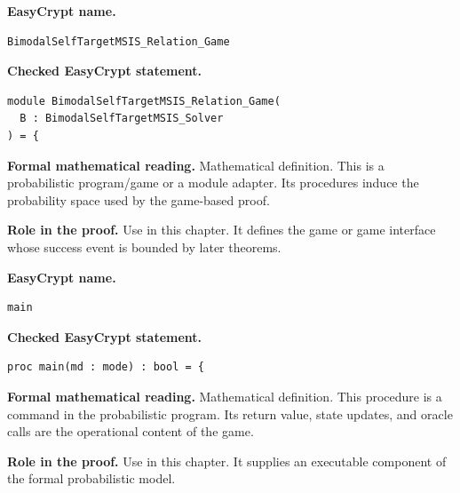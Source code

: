 \begin{formaldefinition}
\noindent\textbf{EasyCrypt name.}
\begin{lstlisting}[language=EasyCrypt,basicstyle=\ttfamily\scriptsize]
BimodalSelfTargetMSIS_Relation_Game
\end{lstlisting}
\noindent\textbf{Checked EasyCrypt statement.}
\begin{lstlisting}[language=EasyCrypt,basicstyle=\ttfamily\scriptsize]
module BimodalSelfTargetMSIS_Relation_Game(
  B : BimodalSelfTargetMSIS_Solver
) = {
\end{lstlisting}
\noindent\textbf{Formal mathematical reading.}
Mathematical definition. This is a probabilistic program/game or a module adapter.  Its procedures induce the probability space used by the game-based proof.

\noindent\textbf{Role in the proof.}
Use in this chapter. It defines the game or game interface whose success event is bounded by later theorems.

\end{formaldefinition}

\begin{formaldefinition}
\noindent\textbf{EasyCrypt name.}
\begin{lstlisting}[language=EasyCrypt,basicstyle=\ttfamily\scriptsize]
main
\end{lstlisting}
\noindent\textbf{Checked EasyCrypt statement.}
\begin{lstlisting}[language=EasyCrypt,basicstyle=\ttfamily\scriptsize]
proc main(md : mode) : bool = {
\end{lstlisting}
\noindent\textbf{Formal mathematical reading.}
Mathematical definition. This procedure is a command in the probabilistic program.  Its return value, state updates, and oracle calls are the operational content of the game.

\noindent\textbf{Role in the proof.}
Use in this chapter. It supplies an executable component of the formal probabilistic model.

\end{formaldefinition}

